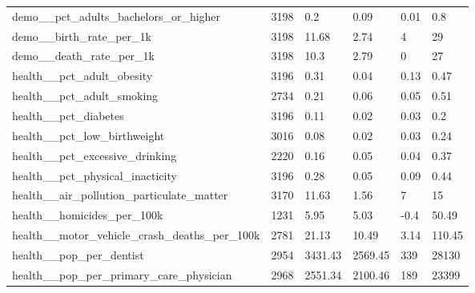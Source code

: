 \begin{table}[]
\begin{adjustwidth}{-.5in}{-.5in}
\begin{tabular}{llllll}
demo\_\_pct\_adults\_bachelors\_or\_higher                & 3198  & 0.2     & 0.09    & 0.01 & 0.8    \\
demo\_\_birth\_rate\_per\_1k                              & 3198  & 11.68   & 2.74    & 4    & 29     \\
demo\_\_death\_rate\_per\_1k                              & 3198  & 10.3    & 2.79    & 0    & 27     \\ \hline
health\_\_pct\_adult\_obesity                             & 3196  & 0.31    & 0.04    & 0.13 & 0.47   \\
health\_\_pct\_adult\_smoking                             & 2734  & 0.21    & 0.06    & 0.05 & 0.51   \\
health\_\_pct\_diabetes                                   & 3196  & 0.11    & 0.02    & 0.03 & 0.2    \\
health\_\_pct\_low\_birthweight                           & 3016  & 0.08    & 0.02    & 0.03 & 0.24   \\
health\_\_pct\_excessive\_drinking                        & 2220  & 0.16    & 0.05    & 0.04 & 0.37   \\
health\_\_pct\_physical\_inacticity                       & 3196  & 0.28    & 0.05    & 0.09 & 0.44   \\
health\_\_air\_pollution\_particulate\_matter             & 3170  & 11.63   & 1.56    & 7    & 15     \\
health\_\_homicides\_per\_100k                            & 1231  & 5.95    & 5.03    & -0.4 & 50.49  \\
health\_\_motor\_vehicle\_crash\_deaths\_per\_100k        & 2781  & 21.13   & 10.49   & 3.14 & 110.45 \\
health\_\_pop\_per\_dentist                               & 2954  & 3431.43 & 2569.45 & 339  & 28130  \\
health\_\_pop\_per\_primary\_care\_physician              & 2968  & 2551.34 & 2100.46 & 189  & 23399  \\
\hline
\end{tabular}
\end{adjustwidth}
\end{table}